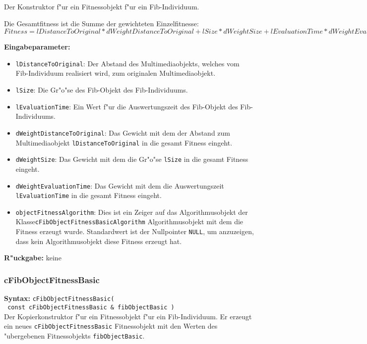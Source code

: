 Der Konstruktor f"ur ein Fitnessobjekt f"ur ein Fib-Individuum.

Die Gesamtfitness ist die Summe der gewichteten Einzelfitnesse: $Fitness=lDistanceToOriginal*dWeightDistanceToOriginal+lSize*dWeightSize+lEvaluationTime*dWeightEvaluationTime$

\bigskip\noindent
\textbf{Eingabeparameter:}
\begin{itemize}
 \item \verb|lDistanceToOriginal|: Der Abstand des Multimediaobjekts, welches vom Fib-Individuum realisiert wird, zum originalen Multimediaobjekt.
 \item \verb|lSize|: Die Gr"o"se des Fib-Objekt des Fib-Individuums.
 \item \verb|lEvaluationTime|: Ein Wert f"ur die Auswertungszeit des Fib-Objekt des Fib-Individuums.
 \item \verb|dWeightDistanceToOriginal|: Das Gewicht mit dem der Abstand zum Multimediaobjekt \verb|lDistanceToOriginal| in die gesamt Fitness eingeht.
 \item \verb|dWeightSize|: Das Gewicht mit dem die Gr"o"se \verb|lSize| in die gesamt Fitness eingeht.
 \item \verb|dWeightEvaluationTime|: Das Gewicht mit dem die Auswertungszeit \verb|lEvaluationTime| in die gesamt Fitness eingeht.
 \item \verb|objectFitnessAlgorithm|: Dies ist ein Zeiger auf das Algorithmusobjekt der Klasse\verb|cFibObjectFitnessBasicAlgorithm| Algorithmusobjekt mit dem die Fitness erzeugt wurde. Standardwert ist der Nullpointer \verb|NULL|, um anzuzeigen, dass kein Algorithmusobjekt diese Fitness erzeugt hat.
\end{itemize}

\bigskip\noindent
\textbf{R"uckgabe:} keine


\subsubsection{cFibObjectFitnessBasic}

\textbf{Syntax:} \verb|cFibObjectFitnessBasic(| \\\verb| const cFibObjectFitnessBasic & fibObjectBasic )| \\

Der Kopierkonstruktor f"ur ein Fitnessobjekt f"ur ein Fib-Individuum. Er erzeugt ein neues \verb|cFibObjectFitnessBasic| Fitnessobjekt mit den Werten des "ubergebenen Fitnessobjekts \verb|fibObjectBasic|.

